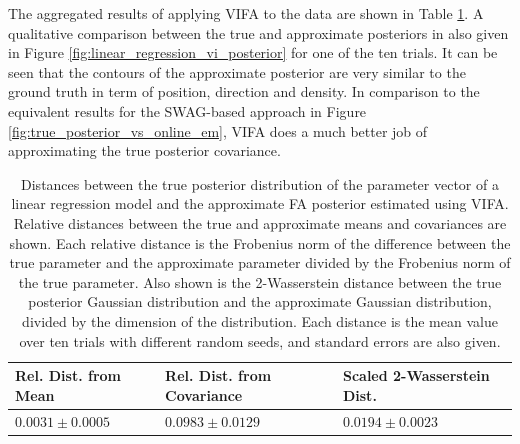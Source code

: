 \documentclass[msc,deptreport.inf]{infthesis} %
\begin{document}
The aggregated results of applying VIFA to the data are shown in Table \ref{table:linear_regression_vi_posterior}. A qualitative comparison between the true and approximate posteriors in also given in Figure \ref{fig:linear_regression_vi_posterior} for one of the ten trials. It can be seen that the contours of the approximate posterior are very similar to the ground truth in term of position, direction and density. In comparison to the equivalent results for the SWAG-based approach in Figure \ref{fig:true_posterior_vs_online_em}, VIFA does a much better job of approximating the true posterior covariance.

\begin{table}[h!]
	\begin{center}
		\begin{tabular}{@{} lll @{}} 
 			\toprule
 			Rel. Dist. from Mean & Rel. Dist. from Covariance & Scaled 2-Wasserstein Dist. \\ [0.5ex] 
 			\midrule
			$0.0031 \pm 0.0005$ 	& $0.0983 \pm 0.0129$ 	& $0.0194 \pm 0.0023$ \\
			\bottomrule
		\end{tabular}
		\caption{Distances between the true posterior distribution of the parameter vector of a linear regression model and the approximate FA posterior estimated using VIFA. Relative distances between the true and approximate means and covariances are shown. Each relative distance is the Frobenius norm of the difference between the true parameter and the approximate parameter divided by the Frobenius norm of the true parameter. Also shown is the 2-Wasserstein distance between the true posterior Gaussian distribution and the approximate Gaussian distribution, divided by the dimension of the distribution. Each distance is the mean value over ten trials with different random seeds, and standard errors are also given.}
		\label{table:linear_regression_vi_posterior}
	\end{center}
\end{table}
\end{document}
